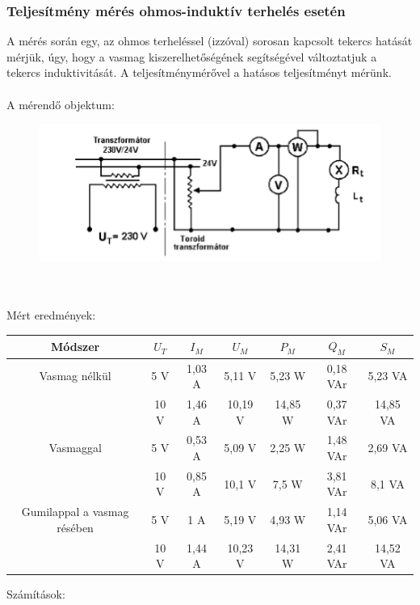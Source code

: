 \documentclass[10pt,a4paper]{article}
\begin{document}
			 \subsubsection{Teljesítmény mérés ohmos-induktív terhelés esetén}
A mérés során egy, az ohmos terheléssel (izzóval) sorosan kapcsolt tekercs hatását mérjük, úgy, hogy a vasmag kiszerelhetőségének segítségével változtatjuk a tekercs induktivitását.
A teljesítménymérővel a hatásos teljesítményt mérünk.
\\\\
A mérendő objektum:\begin{figure}[hbtp]
\centering
\includegraphics[scale=1]{ohm_tekercs.png}
\caption{}
\end{figure}
\\\\ Mért eredmények:$$$$
\begin{tabular}{|c|c|c|c|c|c|c|}
\hline 
Módszer & $U_T$ & $I_M$ & $U_M$ & $P_M$ & $Q_M$ & $S_M$ \\ 
\hline 
Vasmag nélkül & 5 V & 1,03 A & 5,11 V & 5,23 W & 0,18 VAr & 5,23 VA \\ 
\hline 
 & 10 V & 1,46 A & 10,19 V & 14,85 W & 0,37 VAr & 14,85 VA \\ 
\hline 
Vasmaggal & 5 V & 0,53 A & 5,09 V & 2,25 W & 1,48 VAr & 2,69 VA \\ 
\hline 
 & 10 V & 0,85 A & 10,1 V  & 7,5 W & 3,81 VAr & 8,1 VA \\ 
\hline 
Gumilappal a vasmag résében & 5 V & 1 A & 5,19 V & 4,93 W & 1,14 VAr & 5,06 VA \\ 
\hline 
 & 10 V & 1,44 A & 10,23 V  & 14,31 W & 2,41 VAr & 14,52 VA \\ 
\hline 
\end{tabular} 
$$$$
Számítások:
\end{document}
